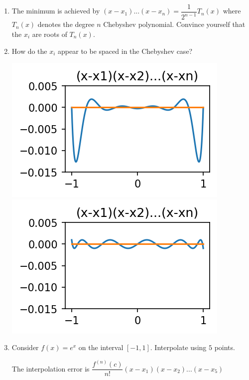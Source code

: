 \documentclass[12pt,letterpaper,noanswers]{exam}
\begin{document}
\begin{enumerate}[resume]
\item The minimum is achieved by $(x-x_1)...(x-x_n) = \dfrac{1}{2^{n-1}}T_n(x)$ where $T_n(x)$ denotes the degree $n$ Chebyshev polynomial. 
Convince yourself that the $x_i$ are roots of $T_n(x)$.
\item How do the $x_i$ appear to be spaced in the Chebyshev case?

\includegraphics{AM111-F23-CourseNotes/img/C10-error.png}\includegraphics{AM111-F23-CourseNotes/img/C10-error-Ch.png}

\item Consider $f(x) = e^x$ on the interval $[-1,1]$.  Interpolate using $5$ points.

The interpolation error is $\dfrac{f^{(n)}(c)}{n!}(x-x_1)(x-x_2)...(x-x_5)$
\end{enumerate}
\end{document}
